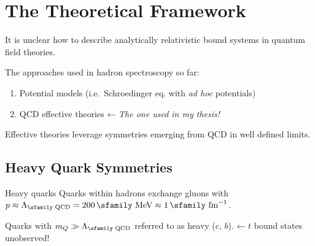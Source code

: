 \documentclass[professionalfonts,aspectratio=169]{beamer}
\begin{document}
%




\section{The Theoretical Framework}

\begin{frame}
  It is unclear how to describe analytically relativistic bound systems in quantum field theories.
  \pause

  The approaches used in hadron spectroscopy so far:
  \begin{enumerate}
    \item Potential models (i.e.~Schroedinger eq. with \emph{ad hoc} potentials)
    \item QCD effective theories ← \emph{The one used in my thesis!}
  \end{enumerate}
  \pause
  
  Effective theories leverage symmetries emerging from QCD in well defined limits.
\end{frame}

\subsection{Heavy Quark Symmetries}

\begin{frame}{Heavy quarks}
  Quarks within hadrons exchange gluons with $p \approx \Lambda_\text{\sfamily QCD} = 200 \, \text{\sfamily MeV} \approx 1 \, \text{\sfamily fm}^{-1}$.

  Quarks with $m_Q \gg \Lambda_\text{\sfamily QCD}$ 
  referred to as heavy ($c$, $b$). ← \alert{$t$ bound states unobserved!}
\end{frame}
\end{document}
